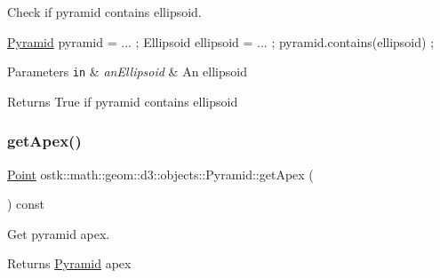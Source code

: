 Check if pyramid contains ellipsoid. 


\begin{DoxyCode}
\hyperlink{classostk_1_1math_1_1geom_1_1d3_1_1objects_1_1_pyramid_a5560d123994714b36d4737b358dadcea}{Pyramid} pyramid = ... ;
Ellipsoid ellipsoid = ... ;
pyramid.contains(ellipsoid) ;
\end{DoxyCode}



\begin{DoxyParams}[1]{Parameters}
\mbox{\tt in}  & {\em an\+Ellipsoid} & An ellipsoid \\
\hline
\end{DoxyParams}
\begin{DoxyReturn}{Returns}
True if pyramid contains ellipsoid 
\end{DoxyReturn}
\mbox{\label{classostk_1_1math_1_1geom_1_1d3_1_1objects_1_1_pyramid_acbc557f7d8bbfe1fc3f59fdad16684a3}} 
\subsubsection{\texorpdfstring{get\+Apex()}{getApex()}}
{\footnotesize\ttfamily \hyperlink{classostk_1_1math_1_1geom_1_1d3_1_1objects_1_1_point}{Point} ostk\+::math\+::geom\+::d3\+::objects\+::\+Pyramid\+::get\+Apex (\begin{DoxyParamCaption}{ }\end{DoxyParamCaption}) const}



Get pyramid apex. 

\begin{DoxyReturn}{Returns}
\hyperlink{classostk_1_1math_1_1geom_1_1d3_1_1objects_1_1_pyramid}{Pyramid} apex 
\end{DoxyReturn}
\mbox{\label{classostk_1_1math_1_1geom_1_1d3_1_1objects_1_1_pyramid_ae1f35fb024a1cd171b750170cb1df0a4}} 
